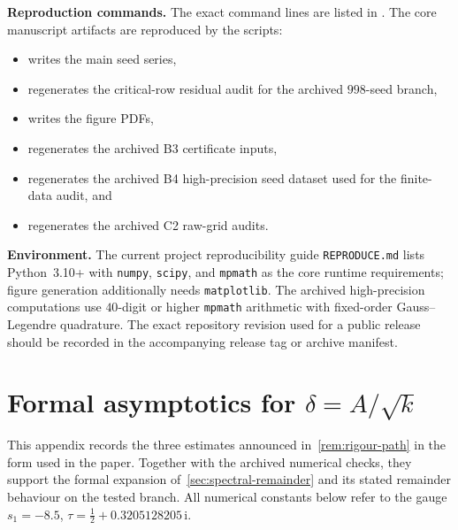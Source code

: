 \documentclass[11pt,a4paper]{article}
\theoremstyle{plain}
\theoremstyle{definition}
\theoremstyle{remark}
\newcommand{\ii}{\mathrm{i}}
\begin{document}
\noindent\textbf{Reproduction commands.}
The exact command lines are listed in .  The core
manuscript artifacts are reproduced by the scripts:
\begin{itemize}[nosep]
\item {} writes the main seed series,
\item {} regenerates the
  critical-row residual audit for the archived $998$-seed branch,
\item {} writes the figure PDFs,
\item {} regenerates the
  archived B3 certificate inputs,
\item {} regenerates the
  archived B4 high-precision seed dataset used for the finite-data audit, and
\item {} regenerates the archived
  C2 raw-grid audits.
\end{itemize}

\noindent\textbf{Environment.}
The current project reproducibility guide \texttt{REPRODUCE.md} lists
Python~3.10+ with \texttt{numpy}, \texttt{scipy}, and \texttt{mpmath} as the
core runtime requirements; figure generation additionally needs
\texttt{matplotlib}.  The archived high-precision computations use
$40$-digit or higher \texttt{mpmath} arithmetic with fixed-order
Gauss--Legendre quadrature.  The exact repository revision used for a
public release should be recorded in the accompanying release tag or
archive manifest.



\section{Formal asymptotics for \texorpdfstring{$\delta = A/\!\sqrt{k}$}{δ=A/√k}}%
\label{app:rigorous}

This appendix records the three estimates announced
in~\cref{rem:rigour-path} in the form used in the paper.
Together with the archived numerical checks, they support the
formal expansion of~\cref{sec:spectral-remainder} and its
stated remainder behaviour on the tested branch.  All numerical constants
below refer to the gauge $s_1 = -8.5$,
$\tau = \frac12 + 0.3205128205\,\ii$.
\end{document}
